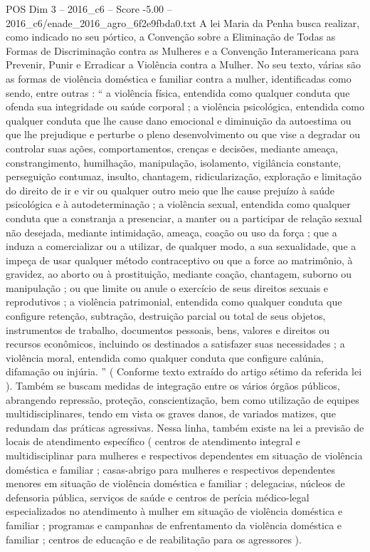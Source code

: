\begin{textsample}{POS Dim 3 – 2016\_c6 – Score -5.00 – 2016\_c6/enade\_2016\_agro\_6f2e9fbda0.txt}
A lei Maria da Penha busca realizar, como indicado no seu pórtico, a Convenção sobre a Eliminação de Todas as Formas de Discriminação contra as Mulheres e a Convenção Interamericana para Prevenir, Punir e Erradicar a Violência contra a Mulher.
No seu texto, várias são as formas de violência doméstica e familiar contra a mulher, identificadas como sendo, entre outras : “ a violência física, entendida como qualquer conduta que ofenda sua integridade ou saúde corporal ; a violência psicológica, entendida como qualquer conduta que lhe cause dano emocional e diminuição da autoestima ou que lhe prejudique e perturbe o pleno desenvolvimento ou que vise a degradar ou controlar suas ações, comportamentos, crenças e decisões, mediante ameaça, constrangimento, humilhação, manipulação, isolamento, vigilância constante, perseguição contumaz, insulto, chantagem, ridicularização, exploração e limitação do direito de ir e vir ou qualquer outro meio que lhe cause prejuízo à saúde psicológica e à autodeterminação ; a violência sexual, entendida como qualquer conduta que a constranja a presenciar, a manter ou a participar de relação sexual não desejada, mediante intimidação, ameaça, coação ou uso da força ; que a induza a comercializar ou a utilizar, de qualquer modo, a sua sexualidade, que a impeça de usar qualquer método contraceptivo ou que a force ao matrimônio, à gravidez, ao aborto ou à prostituição, mediante coação, chantagem, suborno ou manipulação ; ou que limite ou anule o exercício de seus direitos sexuais e reprodutivos ; a violência patrimonial, entendida como qualquer conduta que configure retenção, subtração, destruição parcial ou total de seus objetos, instrumentos de trabalho, documentos pessoais, bens, valores e direitos ou recursos econômicos, incluindo os destinados a satisfazer suas necessidades ; a violência moral, entendida como qualquer conduta que configure calúnia, difamação ou injúria. ” ( Conforme texto extraído do artigo sétimo da referida lei ).
Também se buscam medidas de integração entre os vários órgãos públicos, abrangendo repressão, proteção, conscientização, bem como utilização de equipes multidisciplinares, tendo em vista os graves danos, de variados matizes, que redundam das práticas agressivas.
Nessa linha, também existe na lei a previsão de locais de atendimento específico ( centros de atendimento integral e multidisciplinar para mulheres e respectivos dependentes em situação de violência doméstica e familiar ; casas-abrigo para mulheres e respectivos dependentes menores em situação de violência doméstica e familiar ; delegacias, núcleos de defensoria pública, serviços de saúde e centros de perícia médico-legal especializados no atendimento à mulher em situação de violência doméstica e familiar ; programas e campanhas de enfrentamento da violência doméstica e familiar ; centros de educação e de reabilitação para os agressores ).

\end{textsample}
